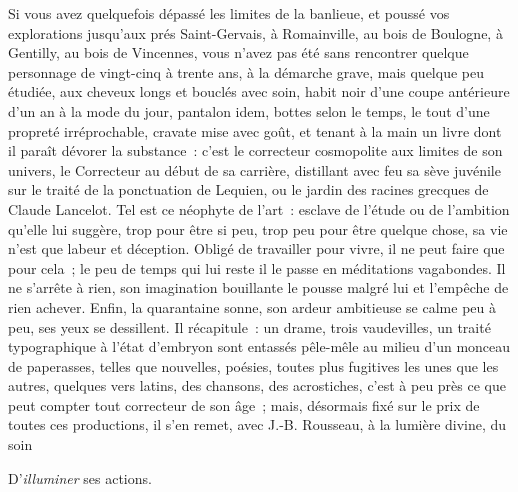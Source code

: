\documentclass[french,twoside]{book} %
\begin{document}
Si vous avez quelquefois dépassé les limites de la banlieue, et poussé vos explorations jusqu’aux prés Saint-Gervais, à Romainville, au bois de Boulogne, à Gentilly, au bois de Vincennes, vous n’avez pas été sans rencontrer quelque personnage de vingt-cinq à trente ans, à la démarche grave, mais quelque peu étudiée, aux cheveux longs et bouclés avec soin, habit noir d’une coupe antérieure d’un an à la mode du jour, pantalon idem, bottes selon le temps, le tout d’une propreté irréprochable, cravate mise avec goût, et tenant à la main un livre dont il paraît dévorer la substance : c’est le correcteur cosmopolite aux limites de son univers, le Correcteur au début de sa carrière,  distillant avec feu sa sève juvénile sur le traité de la ponctuation de Lequien, ou le jardin des racines grecques de Claude Lancelot. Tel est ce néophyte de l’art : esclave de l’étude ou de l’ambition qu’elle lui suggère, trop pour être si peu, trop peu pour être quelque chose, sa vie n’est que labeur et déception. Obligé de travailler pour vivre, il ne peut faire que pour cela ; le peu de temps qui lui reste il le passe en méditations vagabondes. Il ne s’arrête à rien, son imagination bouillante le pousse malgré lui et l’empêche de rien achever. Enfin, la quarantaine sonne, son ardeur ambitieuse se calme peu à peu, ses yeux se dessillent. Il récapitule : un drame, trois vaudevilles, un traité typographique à l’état d’embryon sont entassés pêle-mêle au milieu d’un monceau de paperasses, telles que nouvelles, poésies, toutes plus fugitives les unes que les autres, quelques vers latins, des chansons,  des acrostiches, c’est à peu près ce que peut compter tout correcteur de son âge ; mais, désormais fixé sur le prix de toutes ces productions, il s’en remet, avec J.-B. Rousseau, à la lumière divine, du soin\par

D’\emph{illuminer} ses actions.\\
\end{document}
